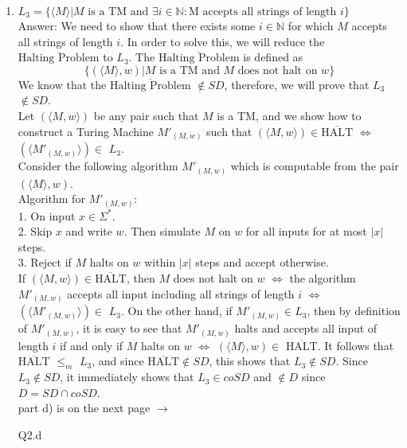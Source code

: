 \documentclass{csc_assignment}
\begin{document}
\begin{description}
\begin{enumerate}
  \item $L_3 = \{\langle{M}\rangle | M \text{ is a TM and }\exists i \in \mathbb{N}: \text{M accepts all strings of length }i\}$ \\
  Answer: We need to show that there exists some $i \in \mathbb{N}$ for which $M$ accepts all strings of length $i$. In order to solve this, we will reduce the $\overline{\text{Halting Problem}}$ to $L_{3}$. The $\overline{\text{Halting Problem}}$ is defined as $$\{(\langle M \rangle, w) | M \text{ is a TM and } M \text{ does not halt on } w\}$$ We know that the $\overline{\text{Halting Problem}}$ $\notin SD$, therefore, we will prove that $L_{3}$ $\notin SD$. \\ Let $(\langle M, w \rangle)$ be any pair such that $M$ is a TM, and we show how to construct a Turing Machine $M'_{(M,w)}$ such that $(\langle M, w \rangle) \in \overline{\text{HALT}}$ $\Leftrightarrow$ $(\langle M'_{(M,w)}\rangle) \in$ $L_{3}$. \\ Consider the following algorithm $M'_{(M,w)}$ which is computable from the pair $(\langle M \rangle, w)$.\\ Algorithm for $M'_{(M,w)}$: \\ 1. On input $x \in \Sigma^{*}$. \\ 2. Skip $x$ and write $w$. Then simulate $M$ on $w$ for all inputs for at most $|x|$ steps. \\ 3. Reject if $M$ halts on $w$ within $|x|$ steps and accept otherwise. \\ If $(\langle M, w \rangle) \in \overline{\text{HALT}}$, then $M$ does not halt on $w$ $\Leftrightarrow$ the algorithm $M'_{(M,w)}$ accepts all input including all strings of length $i$ $\Leftrightarrow$ $(\langle M'_{(M,w)}\rangle) \in$ $L_{3}$. On the other hand, if $M'_{(M,w)} \in L_{3}$, then by definition of $M'_{(M,w)}$, it is easy to see that $M'_{(M,w)}$ halts and accepts all input of length $i$ if and only if $M$ halts on $w$ $\Leftrightarrow$ $(\langle M \rangle, w) \in$ $\overline{\text{HALT}}$. It follows that $\overline{\text{HALT}}$ $\leq_{m}$ $L_{3}$, and since $\overline{\text{HALT}}\notin SD$, this shows that $L_{3} \notin SD$. Since $L_{3} \notin SD$, it immediately shows that $L_{3} \in coSD$ and $\notin D$ since $D = SD \cap coSD$. \\[50pt] part d) is on the next page $\rightarrow$
  
\newpage
\item[Q2.d]


\end{enumerate}
\end{description}
\end{document}
